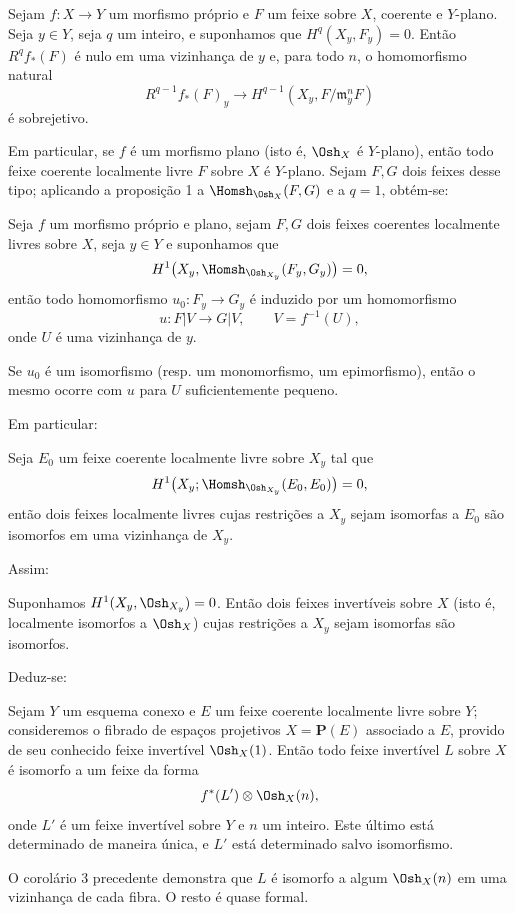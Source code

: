  Sejam $f:X\longrightarrow Y$ um morfismo próprio e $F$
um feixe sobre $X$, coerente e $Y$-plano. Seja $y\in Y$, seja $q$ um inteiro, e
suponhamos que $H^q(X_y,F_y)=0$. Então $R^qf_*(F)$ é nulo em uma vizinhança de
$y$ e, para todo $n$, o homomorfismo natural
\[
  R^{q-1}f_*(F)_y\longrightarrow
  H^{q-1}(X_y,F/\mathfrak m_y^nF)
\]
é sobrejetivo.

Em particular, se $f$ é um morfismo plano (isto é, $\Osh_X$ é $Y$-plano),
então todo feixe coerente localmente livre $F$ sobre $X$ é $Y$-plano. Sejam
$F,G$ dois feixes desse tipo; aplicando a proposição 1 a
$\Homsh_{\Osh_X}(F,G)$ e a $q=1$, obtém-se:

 Seja $f$ um morfismo próprio e plano, sejam $F,G$ dois feixes
coerentes localmente livres sobre $X$, seja $y\in Y$ e suponhamos que
\[
  H^1\bigl(X_y,\Homsh_{\Osh_{X_y}}(F_y,G_y)\bigr)=0,
\]
então todo homomorfismo $u_0:F_y\longrightarrow G_y$ é induzido por um
homomorfismo
\[
  u:F|V\longrightarrow G|V,
  \qquad V=f^{-1}(U),
\]
onde $U$ é uma vizinhança de $y$.

 Se $u_0$ é um isomorfismo (resp. um monomorfismo, um
epimorfismo), então o mesmo ocorre com $u$ para $U$ suficientemente
pequeno.

Em particular:

 Seja $E_0$ um feixe coerente localmente livre sobre $X_y$
tal que
\[
  H^1\bigl(X_y;\Homsh_{\Osh_{X_y}}(E_0,E_0)\bigr)=0,
\]
então dois feixes localmente livres cujas restrições a $X_y$ sejam isomorfas
a $E_0$ são isomorfos em uma vizinhança de $X_y$.

Assim:

 Suponhamos $H^1(X_y,\Osh_{X_y})=0$. Então dois feixes
invertíveis sobre $X$ (isto é, localmente isomorfos a $\Osh_X$) cujas
restrições a $X_y$ sejam isomorfas são isomorfos.

Deduz-se:

 Sejam $Y$ um esquema conexo e $E$ um feixe coerente localmente livre sobre $Y$; consideremos o fibrado de espaços projetivos
$X=\mathbf P(E)$ associado a $E$, provido de seu conhecido feixe invertível
$\Osh_X(1)$. Então todo feixe invertível $L$ sobre $X$ é isomorfo a um feixe da
forma
\[
  f^*(L')\otimes\Osh_X(n),
\]
onde $L'$ é um feixe invertível sobre $Y$ e $n$ um inteiro. Este último está
determinado de maneira única, e $L'$ está determinado salvo isomorfismo.

O corolário 3 precedente demonstra que $L$ é isomorfo a algum $\Osh_X(n)$ em
uma vizinhança de cada fibra. O resto é quase formal.

